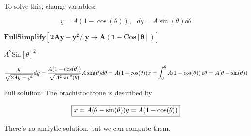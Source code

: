 \documentclass{article}
\begin{document}
To solve this, change variables:

\[y=A(1-\cos (\theta )),\text{      }dy=A \sin (\theta )d\theta\]

\begin{doublespace}
\noindent\(\pmb{\text{FullSimplify}\left[2A y-y^2\text{/.}y\to A(1-\text{Cos}[\theta ])\right]}\)
\end{doublespace}

\begin{doublespace}
\noindent\(A^2 \text{Sin}[\theta ]^2\)
\end{doublespace}

\[\frac{y}{\sqrt{2 A y-y^2}}dy=\frac{A(1-\cos (\theta ))}{\sqrt{A^2\sin ^2(\theta )}}A \sin (\theta ) d\theta =A(1-\cos (\theta ))\\
\\
x=\int_0^{\theta } A(1-\cos (\theta )) \, d\theta =A(\theta -\sin (\theta ))\]

Full solution: The brachistochrone is described by

\[\fbox{$x=A(\theta -\sin (\theta ))y=A(1-\cos (\theta ))$}\]

There{'}s no analytic solution, but we can compute them.
\end{document}
